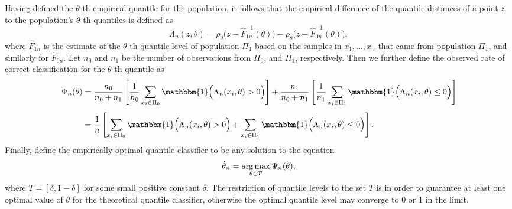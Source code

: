 Having defined the $\theta$-th empirical quantile for the population, it follows
that the empirical difference of the quantile distances of a point $z$ to the
population's $\theta$-th quantiles is defined as
\[
  \Lambda_n (z, \theta) = \rho_{\theta}\Big(z - \hat{F}_{1n}^{-1}(\theta)\Big) -
  \rho_{\theta}\Big(z - \hat{F}_{0n}^{-1}(\theta)\Big),
\]
where $\hat{F}_{1n}$ is the estimate of the $\theta$-th quantile level of
population $\Pi_1$ based on the samples in $x_1, \dots, x_n$ that came from
population $\Pi_1$, and similarly for $\hat{F}_{0n}$.  Let $n_0$ and $n_1$
be the number of observations from $\Pi_0$, and $\Pi_1$, respectively.  Then we
further define the observed rate of correct classification for the $\theta$-th
quantile as
\begin{align}
  \begin{split}
    \Psi_n(\theta)
    &= \frac{n_0}{n_0 + n_1} \left[
      \frac{1}{n_0} \sum_{x_i \in \Pi_0}
      \mathbbm{1}\Big( \Lambda_n(x_i, \theta) > 0 \Big)
    \right] +
      \frac{n_1}{n_0 + n_1} \left[
        \frac{1}{n_1} \sum_{x_i \in \Pi_1}
        \mathbbm{1}\Big( \Lambda_n(x_i, \theta) \leq 0 \Big)
      \right] \\[1ex]
    &= \frac{1}{n} \left[
      \sum_{x_i \in \Pi_0} \mathbbm{1}\Big( \Lambda_n(x_i, \theta) > 0 \Big) +
      \sum_{x_i \in \Pi_1} \mathbbm{1}\Big( \Lambda_n(x_i, \theta) \leq 0 \Big)
    \right].
  \end{split}
\end{align}
Finally, define the empirically optimal quantile classifier to be any solution
to the equation
\begin{equation}
  \label{eq:theta-hat}
  \hat{\theta}_n = \operatorname*{arg\,max}_{\theta \in T} \Psi_n(\theta),
\end{equation}
where $T = [\delta, 1 - \delta]$ for some small positive constant $\delta$.  The
restriction of quantile levels to the set $T$ is in order to guarantee at least
one optimal value of $\theta$ for the theoretical quantile classifier, otherwise
the optimal quantile level may converge to 0 or 1 in the limit.



